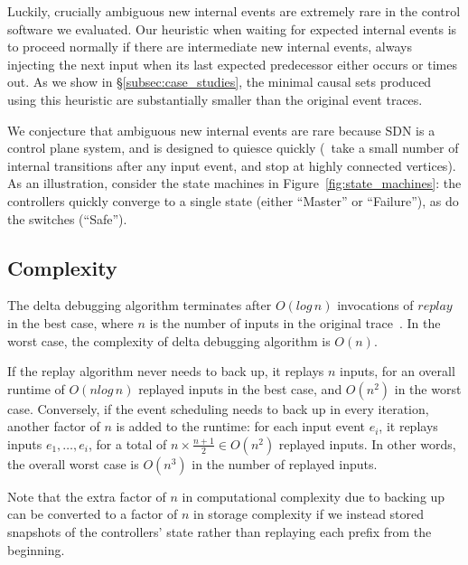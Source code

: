 Luckily, crucially ambiguous new internal events are \num{extremely rare} in the
control software we evaluated. Our heuristic when waiting for expected internal
events is to proceed normally if there are intermediate new internal events,
always injecting the next input when its last expected predecessor
either occurs or times out. As we show in \S\ref{subsec:case_studies},
the minimal causal sets produced using this heuristic are \num{substantially} smaller
than the original event traces. 

We conjecture that ambiguous new internal events are rare because SDN is a control plane system,
and is designed to quiesce quickly (\ie~take a small number of internal
transitions after any input event, and stop at highly connected vertices).
As an illustration, consider the state machines
in Figure~\ref{fig:state_machines}:
the controllers quickly converge to a single state (either ``Master'' or
``Failure''), as do the switches (``Safe'').

\subsection{Complexity}
\label{subsec:complexity}

The delta debugging algorithm terminates after
$O(log\,n)$
invocations of $replay$ in the best case, where $n$ is the number of inputs in the original
trace~\cite{Zeller:1999:YMP:318773.318946}. In the worst case, the complexity
of delta debugging algorithm is $O(n)$.

If the replay algorithm
never needs to back up, it replays $n$ inputs,
for an overall runtime of $O(nlog\,n)$ replayed inputs in the best case, and $O(n^2)$ in the worst case.
Conversely, if the event scheduling
needs to back up in every iteration, another factor of $n$ is added to the
runtime: for each input event
$e_i$, it replays inputs $e_1,\dots,e_i$, for a total of
$n \times \frac{n+1}{2} \in O(n^2)$ replayed inputs. In other words, the
overall worst case is $O(n^3)$ in the number of replayed inputs.

Note that the extra factor of
$n$ in computational complexity due to backing up can be converted to a factor of $n$ in storage
complexity if we instead stored snapshots of
the controllers' state rather than replaying each prefix from the beginning.


